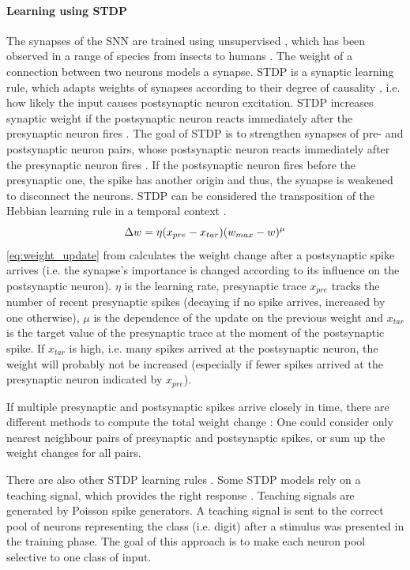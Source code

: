 \paragraph{\textbf{Learning using \ac{STDP}}}
The synapses of the \ac{SNN} are trained using unsupervised , which has been observed in a range of species from insects to humans \cite{STDP_hebbian}. 
The weight of a connection between two neurons models a synapse.
\ac{STDP} is a synaptic learning rule, which adapts weights of synapses according to their degree of causality \cite{STDP_like,multi_scale_STDP},
 i.e. how likely the input causes postsynaptic neuron excitation.
\ac{STDP} increases synaptic weight if the postsynaptic neuron reacts immediately after the presynaptic neuron fires \cite{object_detection_SNN}.
The goal of \ac{STDP} is to strengthen synapses of pre- and postsynaptic neuron pairs, 
whose postsynaptic neuron reacts immediately after the presynaptic neuron fires \cite{object_detection_SNN}.
If the postsynaptic neuron fires before the presynaptic one, the spike has another origin and thus, the synapse is weakened to disconnect the neurons.
\ac{STDP} can be considered the transposition of the Hebbian learning rule in a temporal context \cite{STDP_vis_feat}.
%
\begin{equation}
    \centering
    \label{eq:weight_update}
    \Delta w = \eta (x_{pre} - x_{tar})(w_{max}-w)^\mu
\end{equation}
%
\autoref{eq:weight_update} from \cite{SNN} calculates the weight change after a postsynaptic spike arrives 
(i.e. the synapse's importance is changed according to its influence on the postsynaptic neuron).
$\eta$ is the learning rate, presynaptic trace $x_{pre}$ tracks the number of recent presynaptic spikes 
(decaying if no spike arrives, increased by one otherwise), 
$\mu$ is the dependence of the update on the previous weight and 
$x_{tar}$ is the target value of the presynaptic trace at the moment of the postsynaptic spike.
If $x_{tar}$ is high, i.e. many spikes arrived at the postsynaptic neuron, the weight will probably not be increased 
(especially if fewer spikes arrived at the presynaptic neuron indicated by  $x_{pre}$).

If multiple presynaptic and postsynaptic spikes arrive closely in time, there are different methods to compute the total weight change \cite{simulation_STDP}:
One could consider only nearest neighbour pairs of presynaptic and postsynaptic spikes, or sum up the weight changes for all pairs.

There are also other \ac{STDP} learning rules \cite{SNN,STDP_random}.
Some \ac{STDP} models rely on a teaching signal, which provides the right response \cite{STDP_like}.
Teaching signals are generated by Poisson spike generators.
A teaching signal is sent to the correct pool of neurons representing the class (i.e. digit) after a stimulus was presented in the training phase.
The goal of this approach is to make each neuron pool selective to one class of input.

